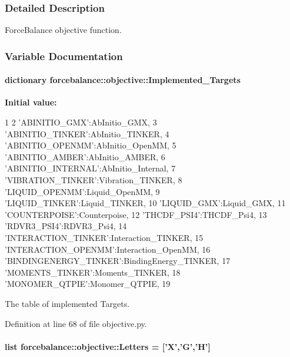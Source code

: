 \subsubsection{\-Detailed \-Description}
\-Force\-Balance objective function. 

\subsubsection{\-Variable \-Documentation}
\hypertarget{namespaceforcebalance_1_1objective_aad3b66466fd22980d2c83c67b82ddddf}{
\paragraph[{\-Implemented\-\_\-\-Targets}]{\setlength{\rightskip}{0pt plus 5cm}dictionary {\bf forcebalance\-::objective\-::\-Implemented\-\_\-\-Targets}}}\label{namespaceforcebalance_1_1objective_aad3b66466fd22980d2c83c67b82ddddf}
{\bfseries \-Initial value\-:}
\begin{DoxyCode}
1 {
2     'ABINITIO_GMX':AbInitio_GMX,
3     'ABINITIO_TINKER':AbInitio_TINKER,
4     'ABINITIO_OPENMM':AbInitio_OpenMM,
5     'ABINITIO_AMBER':AbInitio_AMBER,
6     'ABINITIO_INTERNAL':AbInitio_Internal,
7     'VIBRATION_TINKER':Vibration_TINKER,
8     'LIQUID_OPENMM':Liquid_OpenMM,
9     'LIQUID_TINKER':Liquid_TINKER, 
10     'LIQUID_GMX':Liquid_GMX, 
11     'COUNTERPOISE':Counterpoise,
12     'THCDF_PSI4':THCDF_Psi4,
13     'RDVR3_PSI4':RDVR3_Psi4,
14     'INTERACTION_TINKER':Interaction_TINKER,
15     'INTERACTION_OPENMM':Interaction_OpenMM,
16     'BINDINGENERGY_TINKER':BindingEnergy_TINKER,
17     'MOMENTS_TINKER':Moments_TINKER,
18     'MONOMER_QTPIE':Monomer_QTPIE,
19     }
\end{DoxyCode}


\-The table of implemented \-Targets. 



\-Definition at line 68 of file objective.\-py.

\hypertarget{namespaceforcebalance_1_1objective_a01660ebc02853011e66350c410e26f0a}{
\paragraph[{\-Letters}]{\setlength{\rightskip}{0pt plus 5cm}list {\bf forcebalance\-::objective\-::\-Letters} = \mbox{[}'\-X','\-G','\-H'\mbox{]}}}\label{namespaceforcebalance_1_1objective_a01660ebc02853011e66350c410e26f0a}


